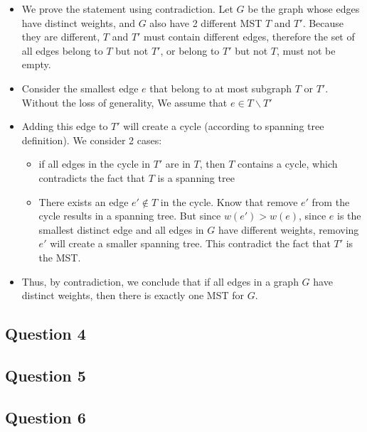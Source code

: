 \documentclass[12pt,english,]{article}
\providecommand{\tightlist}{%
  \setlength{\itemsep}{0pt}\setlength{\parskip}{0pt}}
\begin{document}
\begin{itemize}
\tightlist
\item
  We prove the statement using contradiction. Let \(G\) be the graph
  whose edges have distinct weights, and \(G\) also have 2 different MST
  \(T\) and \(T'\). Because they are different, \(T\) and \(T'\) must
  contain different edges, therefore the set of all edges belong to
  \(T\) but not \(T'\), or belong to \(T'\) but not \(T\), must not be
  empty.
\item
  Consider the smallest edge \(e\) that belong to at most subgraph \(T\)
  or \(T'\). Without the loss of generality, We assume that
  \(e \in T \backslash T'\)
\item
  Adding this edge to \(T'\) will create a cycle (according to spanning
  tree definition). We consider 2 cases:

  \begin{itemize}
  \tightlist
  \item
    if all edges in the cycle in \(T'\) are in \(T\), then \(T\)
    contains a cycle, which contradicts the fact that \(T\) is a
    spanning tree
  \item
    There exists an edge \(e' \notin T\) in the cycle. Know that remove
    \(e'\) from the cycle results in a spanning tree. But since
    \(w(e') > w(e)\), since \(e\) is the smallest distinct edge and all
    edges in \(G\) have different weights, removing \(e'\) will create a
    smaller spanning tree. This contradict the fact that \(T'\) is the
    MST.
  \end{itemize}
\item
  Thus, by contradiction, we conclude that if all edges in a graph \(G\)
  have distinct weights, then there is exactly one MST for \(G\).
\end{itemize}

\hypertarget{question-4}{%
\subsection{Question 4}\label{question-4}}

\hypertarget{question-5}{%
\subsection{Question 5}\label{question-5}}

\hypertarget{question-6}{%
\subsection{Question 6}\label{question-6}}
\end{document}

